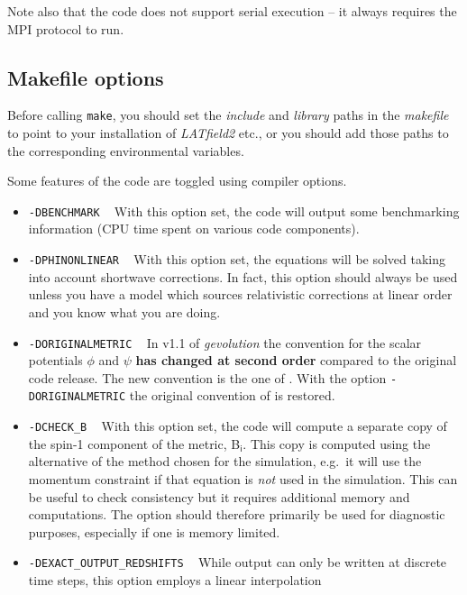 \documentclass[a4paper,10pt]{article}
\begin{document}
\noindent Note also that the code does not support serial execution -- it always requires the MPI protocol to run.

\subsection{Makefile options}

Before calling \texttt{make}, you should set the \textit{include} and \textit{library} paths in the \textit{makefile} to point to your installation of \textit{LATfield2} etc., or you should add those paths to the corresponding environmental variables.

Some features of the code are toggled using compiler options.

\begin{itemize}
 \item[] \hspace{-25pt}\texttt{-DBENCHMARK} ~ With this option set, the code will output some benchmarking information (CPU time spent on various code components).
 \item[] \hspace{-25pt}\texttt{-DPHINONLINEAR} ~ With this option set, the equations will be solved taking into account shortwave corrections. In fact, this option should always be used unless you have a model which sources relativistic corrections at linear order and you know what you are doing.
 \item[] \hspace{-25pt}\texttt{-DORIGINALMETRIC} ~ In v1.1 of \textit{gevolution} the convention for the scalar potentials $\mathsf{\phi}$ and $\mathsf{\psi}$ \textbf{has changed at second order} compared to the original code release. The new convention is the one of \cite{Adamek:2017grt}. With the option \texttt{-DORIGINALMETRIC} the original convention of \cite{Adamek:2016zes} is restored.
 \item[] \hspace{-25pt}\texttt{-DCHECK\_B} ~ With this option set, the code will compute a separate copy of the spin-1 component of the
 metric, B$_\mathsf{i}$. This copy is computed using the alternative of the method chosen for the simulation, e.g.\ it will use the
 momentum constraint if that equation is \textit{not} used in the simulation. This can be useful to check consistency but it requires
 additional memory and computations. The option should therefore primarily be used for diagnostic purposes, especially if one is memory limited.
 \item[] \hspace{-25pt}\texttt{-DEXACT\_OUTPUT\_REDSHIFTS} ~ While output can only be written at discrete time steps, this option employs a linear interpolation

\end{itemize}
\end{document}
